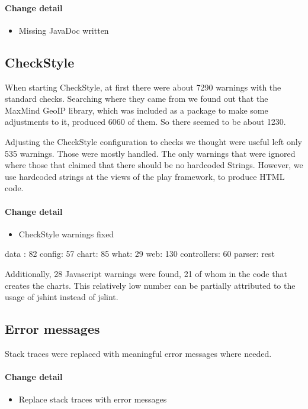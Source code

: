 \paragraph{Change detail}
\begin{itemize}
  \item Missing JavaDoc written
\end{itemize}

\pagebreak[4]
\subsection{CheckStyle}\label{cs} %
When starting CheckStyle, at first there were about 7290 warnings with the standard checks.
Searching where they came from we found out that the MaxMind GeoIP library, 
which was included as a package to make some adjustments to it, produced 6060 of them. So there seemed to be about
1230.

Adjusting the CheckStyle configuration to checks we thought were useful left only 535 warnings.
Those were mostly handled. The only warnings that were ignored where those that claimed that there should be no hardcoded Strings.
However, we use hardcoded strings at the views of the play framework, to produce HTML code.

\paragraph{Change detail}
\begin{itemize}
  \item CheckStyle warnings fixed
\end{itemize}
data : 82
config: 57
chart: 85
what: 29
web: 130
controllers: 60 
parser: rest

Additionally, 28 Javascript warnings were found, 21 of whom in the code that creates the charts.
This relatively low number can be partially attributed to the usage of jshint instead of jslint.

\subsection{Error messages}
Stack traces were replaced with meaningful error messages where needed.
\paragraph{Change detail}
\begin{itemize}
  \item Replace stack traces with error messages
\end{itemize}

 
